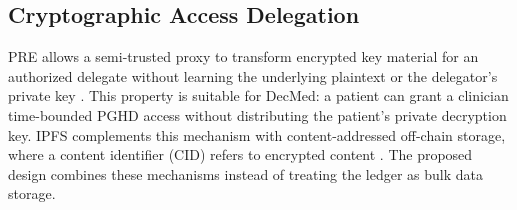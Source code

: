 \subsection{Cryptographic Access Delegation}

PRE allows a semi-trusted proxy to transform encrypted key material for an authorized delegate without learning the underlying plaintext or the delegator's private key \cite{nunez2017proxy}.
This property is suitable for DecMed: a patient can grant a clinician time-bounded PGHD access without distributing the patient's private decryption key.
IPFS complements this mechanism with content-addressed off-chain storage, where a content identifier (CID) refers to encrypted content \cite{Benet_2014_ipfs}.
The proposed design combines these mechanisms instead of treating the ledger as bulk data storage.
